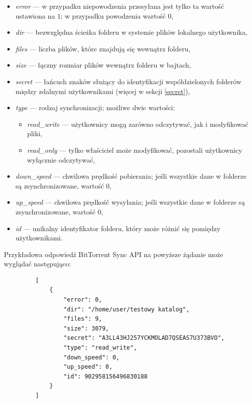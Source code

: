 \begin{itemize}[noitemsep]
  \item \emph{error} --- w przypadku niepowodzenia przesyłana jest tylko ta wartość ustawiona na $1$; w przypadku powodzenia wartość $0$,
  
  \item \emph{dir} --- bezwzględna ścieżka folderu w systemie plików lokalnego użytkownika,
  
  \item \emph{files} --- liczba plików, które znajdują się wewnątrz folderu,
  
  \item \emph{size} --- łączny rozmiar plików wewnątrz folderu w bajtach,
  
  \item \emph{secret} --- łańcuch znaków służący do identyfikacji współdzielonych folderów między zdalnymi użytkownikami (więcej w sekcji \ref{secret}),
  
  \item \emph{type} --- rodzaj synchronizacji; możliwe dwie wartości:
  \begin{itemize}[noitemsep]
    \item \emph{read\_write} --- użytkownicy mogą zarówno odczytywać, jak i modyfikować pliki,
    
    \item \emph{read\_only} --- tylko właściciel może modyfikować, pozostali użytkownicy wyłącznie odczytywać,
  \end{itemize}
  
  \item \emph{down\_speed} --- chwilowa prędkość pobierania; jeśli wszystkie dane w folderze są zsynchronizowane, wartość $0$,
  
  \item \emph{up\_speed} --- chwilowa prędkość wysyłania; jeśli wszystkie dane w folderze są zsynchronizowane, wartość $0$,
  
  \item \emph{id} --- unikalny identyfikator folderu, który może różnić się pomiędzy użytkownikami.
\end{itemize}

Przykładowa odpowiedź BitTorrent Sync API na powyższe żądanie może wyglądać następująco:

\begin{minipage}{\linewidth}
\vspace{15pt}
\begin{verbatim}
         [
             {
                 "error": 0, 
                 "dir": "/home/user/testowy katalog", 
                 "files": 9, 
                 "size": 3079, 
                 "secret": "A3LL43HJ257YCKMOLAD7QSEAS7U373BVO", 
                 "type": "read_write", 
                 "down_speed": 0, 
                 "up_speed": 0, 
                 "id": 902958156496830188
             }
         ]
\end{verbatim}
\vspace{15pt}
\end{minipage}


